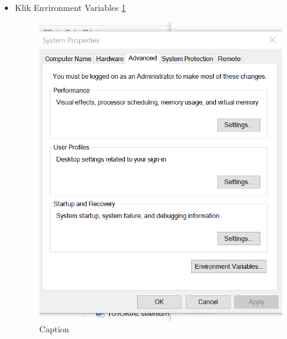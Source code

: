 \begin{enumerate}
\begin{itemize}
        \item Klik Environment Variables \ref{capture6}
        \begin{figure} [h]
            \centering
            \includegraphics[scale=0.3]{figures/Capture6.PNG}
            \caption{Caption}
            \label{capture6}
        \end{figure}
        

\end{itemize}
\end{enumerate}
